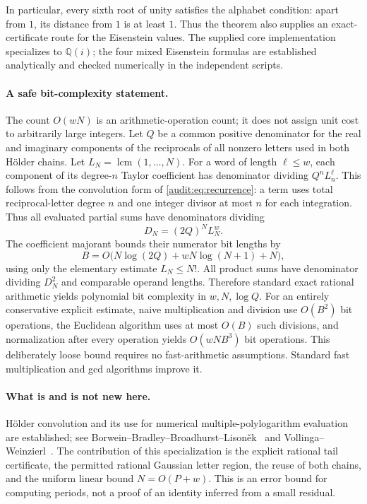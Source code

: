 In particular, every sixth root of unity satisfies the alphabet
condition: apart from $1$, its distance from $1$ is at least $1$.
Thus the theorem also supplies an exact-certificate route for the
Eisenstein values. The supplied core implementation specializes to
$\mathbb Q(i)$; the four mixed Eisenstein formulas are established
analytically and checked numerically in the independent scripts.

\paragraph{A safe bit-complexity statement.}
The count $O(wN)$ is an arithmetic-operation count; it does not assign
unit cost to arbitrarily large integers. Let $Q$ be a common positive
denominator for the real and imaginary components of the reciprocals
of all nonzero letters used in both Hölder chains. Let
$L_N=\operatorname{lcm}(1,\ldots,N)$. For a word of length $\ell\leq w$,
each component of its degree-$n$ Taylor coefficient has denominator
dividing $Q^nL_n^\ell$. This follows from the convolution form of
\eqref{audit:eq:recurrence}: a term uses total reciprocal-letter degree
$n$ and one integer divisor at most $n$ for each integration.
Thus all evaluated partial sums have denominators dividing
\[
 D_N=(2Q)^N L_N^w.
\]
The coefficient majorant bounds their numerator bit lengths by
\[
 B=O\bigl(N\log(2Q)+wN\log(N+1)+N\bigr),
\]
using only the elementary estimate $L_N\leq N!$.
All product sums have denominator dividing $D_N^2$ and comparable
operand lengths. Therefore standard exact rational arithmetic yields
polynomial bit complexity in $w,N,\log Q$. For an entirely conservative
explicit estimate, naive multiplication and division use $O(B^2)$ bit
operations, the Euclidean algorithm uses at most $O(B)$ such divisions,
and normalization after every operation yields $O(wNB^3)$ bit
operations. This deliberately loose bound requires no fast-arithmetic
assumptions. Standard fast multiplication and gcd algorithms improve it.

\paragraph{What is and is not new here.}
Hölder convolution and its use for numerical multiple-polylogarithm
evaluation are established; see Borwein--Bradley--Broadhurst--Lison\v ek~\cite{BBBL2001}
and Vollinga--Weinzierl~\cite{VollingaWeinzierl2005}. The contribution of this specialization is the
explicit rational tail certificate, the permitted rational Gaussian
letter region, the reuse of both chains, and the uniform linear bound
$N=O(P+w)$. This is an error bound for computing periods, not a proof of
an identity inferred from a small residual.

